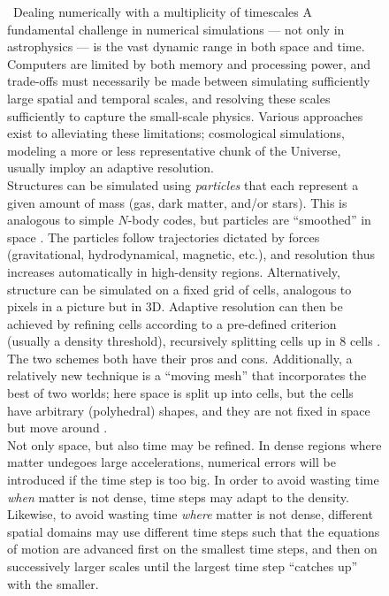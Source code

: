 \documentclass[useAMS,usenatbib,bibyear]{aa}
\begin{document}
\begin{figure}[!t]
\begin{bclogo}[
    couleur=gray!20,
    epBord=1,
    arrondi=0.1,
    logo=\bcinfo,
    marge=8,
    ombre=false, %
    couleurBord=gray!60,
    barre=line]
    { \ \textsf{Dealing numerically with a multiplicity of timescales}}
    \small{\textsf{A fundamental challenge in numerical simulations --- not only in astrophysics --- is the vast dynamic range in both space and time.
    Computers are limited by both memory and processing power, and trade-offs must necessarily be made between simulating sufficiently large spatial and temporal scales, and resolving these scales sufficiently to capture the small-scale physics.
    Various approaches exist to alleviating these limitations; cosmological simulations, modeling a more or less representative chunk of the Universe, usually imploy an adaptive resolution.\vspace{1mm}\\
    Structures can be simulated using \emph{particles} that each represent a given amount of mass (gas, dark matter, and/or stars).
    This is analogous to simple $N$-body codes, but particles are ``smoothed'' in space \citep{Gingold1977,Lucy1977}.
    The particles follow trajectories dictated by forces (gravitational, hydrodynamical, magnetic, etc.), and resolution thus increases automatically in high-density regions.
    Alternatively, structure can be simulated on a fixed grid of cells, analogous to pixels in a picture but in 3D.
    Adaptive resolution can then be achieved by refining cells according to a pre-defined criterion (usually a density threshold), recursively splitting cells up in 8 cells \citep{Berger1984,Berger1989}.
    The two schemes both have their pros and cons.
    Additionally, a relatively new technique is a ``moving mesh'' that incorporates the best of two worlds; here space is split up into cells, but the cells have arbitrary (polyhedral) shapes, and they are not fixed in space but move around \citep{Springel2010}.\vspace{1mm}\\
    Not only space, but also time may be refined.
    In dense regions where matter undegoes large accelerations, numerical errors will be introduced if the time step is too big.
    In order to avoid wasting time \emph{when} matter is not dense, time steps may adapt to the density.
    Likewise, to avoid wasting time \emph{where} matter is not dense, different spatial domains may use different time steps such that the equations of motion are advanced first on the smallest time steps, and then on successively larger scales until the largest time step ``catches up'' with the smaller.
    }}
\label{info:adaptive}
\end{bclogo}
     \endminipage
\end{figure}
\end{document}
